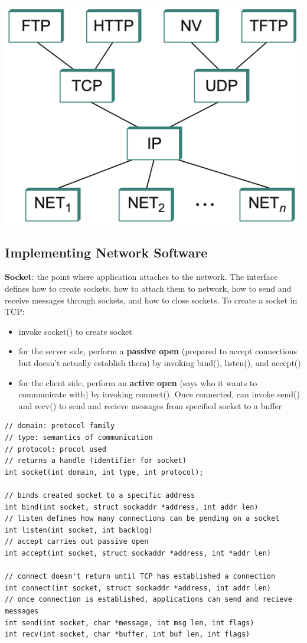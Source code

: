 \documentclass{article}
\begin{document}
  \begin{center}
    \includegraphics[scale=0.5]{InternetArchitecture}
  \end{center}
  \subsection{Implementing Network Software}
  \textbf{Socket}: the point where application attaches to the network. The interface defines how to create sockets, how to attach them to network, how to send and receive messages through sockets, and how to close sockets. To create a socket in TCP:
    \begin{itemize}
      \item invoke socket() to create socket
      \item for the server side, perform a \textbf{passive open} (prepared to accept connections but doesn't actually establish them) by invoking bind(), listen(), and accept()
      \item for the client side, perform an \textbf{active open} (says who it wants to communicate with) by invoking connect(). Once connected, can invoke send() and recv() to send and recieve messages from specified socket to a buffer
    \end{itemize}
\begin{lstlisting}
// domain: protocol family
// type: semantics of communication
// protocol: procol used
// returns a handle (identifier for socket)
int socket(int domain, int type, int protocol);

// binds created socket to a specific address
int bind(int socket, struct sockaddr *address, int addr len)
// listen defines how many connections can be pending on a socket
int listen(int socket, int backlog)
// accept carries out passive open
int accept(int socket, struct sockaddr *address, int *addr len)

// connect doesn't return until TCP has established a connection
int connect(int socket, struct sockaddr *address, int addr len)
// once connection is established, applications can send and recieve messages
int send(int socket, char *message, int msg len, int flags)
int recv(int socket, char *buffer, int buf len, int flags)
\end{lstlisting}
\end{document}
